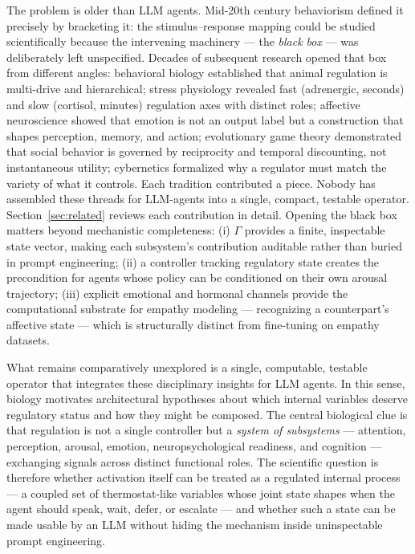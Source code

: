 \documentclass{article}
\begin{document}
The problem is older than LLM agents. Mid-20th century behaviorism defined it precisely by bracketing it: the stimulus--response mapping could be studied scientifically because the intervening machinery --- the \textit{black box} --- was deliberately left unspecified. Decades of subsequent research opened that box from different angles: behavioral biology established that animal regulation is multi-drive and hierarchical; stress physiology revealed fast (adrenergic, seconds) and slow (cortisol, minutes) regulation axes with distinct roles; affective neuroscience showed that emotion is not an output label but a construction that shapes perception, memory, and action; evolutionary game theory demonstrated that social behavior is governed by reciprocity and temporal discounting, not instantaneous utility; cybernetics formalized why a regulator must match the variety of what it controls. Each tradition contributed a piece. Nobody has assembled these threads for LLM-agents into a single, compact, testable operator. Section~\ref{sec:related} reviews each contribution in detail. Opening the black box matters beyond mechanistic completeness: (i) $\Gamma$ provides a finite, inspectable state vector, making each subsystem's contribution auditable rather than buried in prompt engineering; (ii) a controller tracking regulatory state creates the precondition for agents whose policy can be conditioned on their own arousal trajectory; (iii) explicit emotional and hormonal channels provide the computational substrate for empathy modeling --- recognizing a counterpart's affective state --- which is structurally distinct from fine-tuning on empathy datasets.

What remains comparatively unexplored is a single, computable, testable operator that integrates these disciplinary insights for LLM agents. In this sense, biology motivates architectural hypotheses about which internal variables deserve regulatory status and how they might be composed. The central biological clue is that regulation is not a single controller but a \textit{system of subsystems} --- attention, perception, arousal, emotion, neuropsychological readiness, and cognition --- exchanging signals across distinct functional roles. The scientific question is therefore whether activation itself can be treated as a regulated internal process --- a coupled set of thermostat-like variables whose joint state shapes when the agent should speak, wait, defer, or escalate --- and whether such a state can be made usable by an LLM without hiding the mechanism inside uninspectable prompt engineering.
\end{document}
